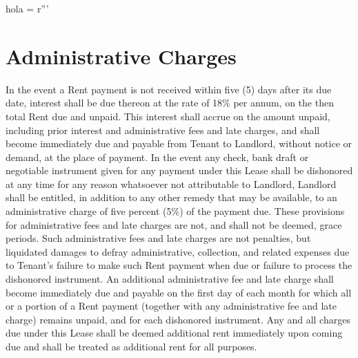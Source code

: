 hola = r'''\documentclass{article}
\begin{document}
\section{Administrative Charges}
    In the event a Rent payment is not received within five (5) days after its due date, interest shall be due thereon at the rate of 18\% per annum, on the then total Rent due and unpaid. This interest shall accrue on the amount unpaid, including prior interest and administrative fees and late charges, and shall become immediately due and payable from Tenant to Landlord, without notice or demand, at the place of payment. In the event any check, bank draft or negotiable instrument given for any payment under this Lease shall be dishonored at any time for any reason whatsoever not attributable to Landlord, Landlord shall be entitled, in addition to any other remedy that may be available, to an administrative charge of five percent (5\%) of the payment due. These provisions for administrative fees and late charges are not, and shall not be deemed, grace periods. Such administrative fees and late charges are not penalties, but liquidated damages to defray administrative, collection, and related expenses due to Tenant's failure to make such Rent payment when due or failure to process the dishonored instrument. An additional administrative fee and late charge shall become immediately due and payable on the first day of each month for which all or a portion of a Rent payment (together with any administrative fee and late charge) remains unpaid, and for each dishonored instrument. Any and all charges due under this Lease shall be deemed additional rent immediately upon coming due and shall be treated as additional rent for all purposes. 
\end{document}
